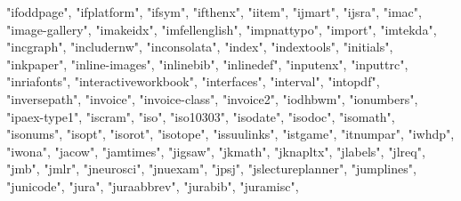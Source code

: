 \documentclass[
]{article}
\newenvironment{Shaded}{\begin{snugshade}}{\end{snugshade}}
\newcommand{\NormalTok}[1]{#1}
\newcommand{\StringTok}[1]{\textcolor[rgb]{0.31,0.60,0.02}{#1}}
\begin{document}
\begin{Shaded}
\begin{Highlighting}[]
\StringTok{"ifoddpage"}\NormalTok{, }\StringTok{"ifplatform"}\NormalTok{, }\StringTok{"ifsym"}\NormalTok{, }\StringTok{"ifthenx"}\NormalTok{, }\StringTok{"iitem"}\NormalTok{, }\StringTok{"ijmart"}\NormalTok{, }
\StringTok{"ijsra"}\NormalTok{, }\StringTok{"imac"}\NormalTok{, }\StringTok{"image{-}gallery"}\NormalTok{, }\StringTok{"imakeidx"}\NormalTok{, }\StringTok{"imfellenglish"}\NormalTok{, }
\StringTok{"impnattypo"}\NormalTok{, }\StringTok{"import"}\NormalTok{, }\StringTok{"imtekda"}\NormalTok{, }\StringTok{"incgraph"}\NormalTok{, }\StringTok{"includernw"}\NormalTok{, }
\StringTok{"inconsolata"}\NormalTok{, }\StringTok{"index"}\NormalTok{, }\StringTok{"indextools"}\NormalTok{, }\StringTok{"initials"}\NormalTok{, }\StringTok{"inkpaper"}\NormalTok{, }
\StringTok{"inline{-}images"}\NormalTok{, }\StringTok{"inlinebib"}\NormalTok{, }\StringTok{"inlinedef"}\NormalTok{, }\StringTok{"inputenx"}\NormalTok{, }\StringTok{"inputtrc"}\NormalTok{, }
\StringTok{"inriafonts"}\NormalTok{, }\StringTok{"interactiveworkbook"}\NormalTok{, }\StringTok{"interfaces"}\NormalTok{, }\StringTok{"interval"}\NormalTok{, }
\StringTok{"intopdf"}\NormalTok{, }\StringTok{"inversepath"}\NormalTok{, }\StringTok{"invoice"}\NormalTok{, }\StringTok{"invoice{-}class"}\NormalTok{, }\StringTok{"invoice2"}\NormalTok{, }
\StringTok{"iodhbwm"}\NormalTok{, }\StringTok{"ionumbers"}\NormalTok{, }\StringTok{"ipaex{-}type1"}\NormalTok{, }\StringTok{"iscram"}\NormalTok{, }\StringTok{"iso"}\NormalTok{, }\StringTok{"iso10303"}\NormalTok{, }
\StringTok{"isodate"}\NormalTok{, }\StringTok{"isodoc"}\NormalTok{, }\StringTok{"isomath"}\NormalTok{, }\StringTok{"isonums"}\NormalTok{, }\StringTok{"isopt"}\NormalTok{, }\StringTok{"isorot"}\NormalTok{, }
\StringTok{"isotope"}\NormalTok{, }\StringTok{"issuulinks"}\NormalTok{, }\StringTok{"istgame"}\NormalTok{, }\StringTok{"itnumpar"}\NormalTok{, }\StringTok{"iwhdp"}\NormalTok{, }\StringTok{"iwona"}\NormalTok{, }
\StringTok{"jacow"}\NormalTok{, }\StringTok{"jamtimes"}\NormalTok{, }\StringTok{"jigsaw"}\NormalTok{, }\StringTok{"jkmath"}\NormalTok{, }\StringTok{"jknapltx"}\NormalTok{, }\StringTok{"jlabels"}\NormalTok{, }
\StringTok{"jlreq"}\NormalTok{, }\StringTok{"jmb"}\NormalTok{, }\StringTok{"jmlr"}\NormalTok{, }\StringTok{"jneurosci"}\NormalTok{, }\StringTok{"jnuexam"}\NormalTok{, }\StringTok{"jpsj"}\NormalTok{, }\StringTok{"jslectureplanner"}\NormalTok{, }
\StringTok{"jumplines"}\NormalTok{, }\StringTok{"junicode"}\NormalTok{, }\StringTok{"jura"}\NormalTok{, }\StringTok{"juraabbrev"}\NormalTok{, }\StringTok{"jurabib"}\NormalTok{, }\StringTok{"juramisc"}\NormalTok{, }

\end{Highlighting}
\end{Shaded}
\end{document}
